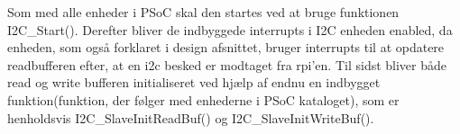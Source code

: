 \documentclass[Softwaredesign/Softwaredesign_main.tex]{subfiles}
\begin{document}
Som med alle enheder i PSoC skal den startes ved at bruge funktionen I2C\_Start(). Derefter bliver de indbyggede interrupts i I2C enheden enabled, da enheden, som også forklaret i design afsnittet, bruger interrupts til at opdatere readbufferen efter, at en i2c besked er modtaget fra rpi'en. Til sidst bliver både read og write bufferen initialiseret ved hjælp af endnu en indbygget funktion(funktion, der følger med enhederne i PSoC kataloget), som er henholdsvis I2C\_SlaveInitReadBuf() og I2C\_SlaveInitWriteBuf(). 
\end{document}
